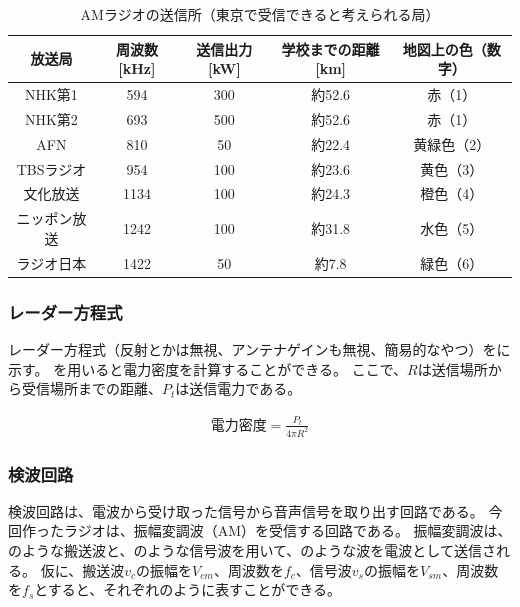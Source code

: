 \documentclass[report.tex]{subfiles}
\begin{document}
\begin{table}[H]
	\centering
	\caption{AMラジオの送信所（東京で受信できると考えられる局）}
	\label{tab:zyushin}
	\begin{tabular}{ccccc} \hline
		放送局    & 周波数[kHz] & 送信出力[kW] & 学校までの距離[km] & 地図上の色（数字） \\ \hline
		NHK第1  & 594      & 300      & 約52.6       & 赤（1）      \\
		NHK第2  & 693      & 500      & 約52.6       & 赤（1）      \\
		AFN    & 810      & 50       & 約22.4       & 黄緑色（2）    \\
		TBSラジオ & 954      & 100      & 約23.6       & 黄色（3）     \\
		文化放送   & 1134     & 100      & 約24.3       & 橙色（4）     \\
		ニッポン放送 & 1242     & 100      & 約31.8       & 水色（5）     \\
		ラジオ日本  & 1422     & 50       & 約7.8        & 緑色（6）     \\ \hline
	\end{tabular}
\end{table}

\subsubsection{レーダー方程式}

レーダー方程式（反射とかは無視、アンテナゲインも無視、簡易的なやつ）をに示す。
を用いると電力密度を計算することができる。
ここで、\(R\)は送信場所から受信場所までの距離、\(P_t\)は送信電力である。

\begin{align}
	電力密度 = \frac{P_t}{4 \pi R^2} \label{eq:radar}
\end{align}

\subsubsection{検波回路}

検波回路は、電波から受け取った信号から音声信号を取り出す回路である。
今回作ったラジオは、振幅変調波（AM）を受信する回路である。
振幅変調波は、のような搬送波と、のような信号波を用いて、のような波を電波として送信される。
仮に、搬送波\(v_c\)の振幅を\(V_{cm}\)、周波数を\(f_c\)、信号波\(v_s\)の振幅を\(V_{sm}\)、周波数を\(f_s\)とすると、それぞれのように表すことができる。
\end{document}
